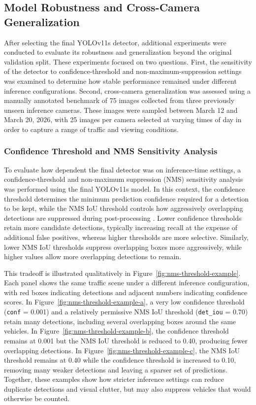 \subsection{Model Robustness and Cross-Camera Generalization}

After selecting the final YOLOv11s detector, additional experiments were conducted to evaluate 
its robustness and generalization beyond the original validation split. These 
experiments focused on two questions. First, the sensitivity of the detector to
confidence-threshold and non-maximum-suppression settings was examined to determine 
how stable performance remained under different inference configurations. Second, 
cross-camera generalization was assessed using a manually annotated benchmark of 
75 images collected from three previously unseen inference cameras. These images 
were sampled between March 12 and March 20, 2026, with 25 images per camera selected 
at varying times of day in order to capture a range of traffic and viewing conditions.

\subsubsection{Confidence Threshold and NMS Sensitivity Analysis}
\label{sec:conf-nms-analysis}

To evaluate how dependent the final detector was on inference-time settings, a 
confidence-threshold and non-maximum suppression (NMS) sensitivity analysis was performed 
using the final YOLOv11s model. In this context, the confidence threshold determines
the minimum prediction confidence required for a detection to be kept, while 
the NMS IoU threshold controls how aggressively overlapping detections are suppressed 
during post-processing \cite{ultralytics_validation}. 
Lower confidence thresholds retain more candidate detections,
typically increasing recall at the expense of additional false positives, whereas 
higher thresholds are more selective. Similarly, lower NMS IoU thresholds suppress
overlapping boxes more aggressively, while higher values allow more overlapping 
detections to remain.

This tradeoff is illustrated qualitatively in Figure~\ref{fig:nms-threshold-example}.
Each panel shows the same traffic scene under a different inference configuration, 
with red boxes indicating detections and adjacent numbers indicating confidence scores.
In Figure~\ref{fig:nms-threshold-example-a}, a very low confidence threshold 
(\verb|conf| = 0.001) and a relatively permissive NMS IoU threshold 
(\verb|det_iou| = 0.70) retain many detections, including several overlapping boxes 
around the same vehicles. In Figure~\ref{fig:nms-threshold-example-b}, the confidence
threshold remains at 0.001 but the NMS IoU threshold is reduced to 0.40, producing 
fewer overlapping detections. In Figure~\ref{fig:nms-threshold-example-c}, the NMS
IoU threshold remains at 0.40 while the confidence threshold is increased to 0.10, 
removing many weaker detections and leaving a sparser set of predictions. Together,
these examples show how stricter inference settings can reduce duplicate detections 
and visual clutter, but may also suppress vehicles that would otherwise be counted.


